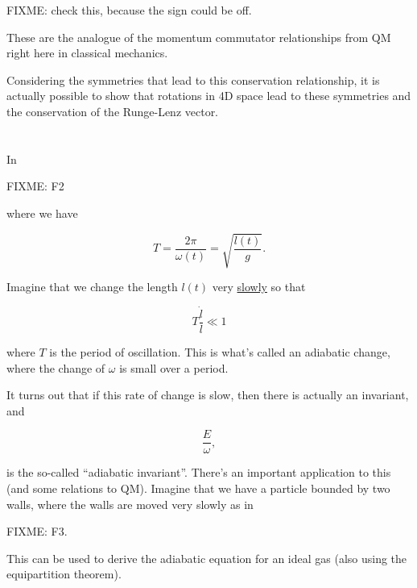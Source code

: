 FIXME: check this, because the sign could be off.

These are the analogue of the momentum commutator relationships from QM right here in classical mechanics.

Considering the symmetries that lead to this conservation relationship, it is actually possible to show that rotations in 4D space lead to these symmetries and the conservation of the Runge-Lenz vector.

\section{}

In 

FIXME: F2

where we have

\begin{equation}\label{eqn:phaseSpaceAndTrajectories:n}
T = \frac{2 \pi}{\omega(t)} = \sqrt{\frac{l(t)}{g}}.
\end{equation}

Imagine that we change the length $l(t)$ very \underline{slowly} so that

\begin{equation}\label{eqn:phaseSpaceAndTrajectories:n}
T \frac{\dot{l}}{l} \ll 1
\end{equation}

where $T$ is the period of oscillation.  This is what's called an adiabatic change, where the change of $\omega$ is small over a period.

It turns out that if this rate of change is slow, then there is actually an invariant, and

\begin{equation}\label{eqn:phaseSpaceAndTrajectories:n}
\frac{E}{\omega},
\end{equation}

is the so-called ``adiabatic invariant''.  There's an important application to this (and some relations to QM).  Imagine that we have a particle bounded by two walls, where the walls are moved very slowly as in

FIXME: F3.

This can be used to derive the adiabatic equation for an ideal gas (also using the equipartition theorem).

\EndNoBibArticle
